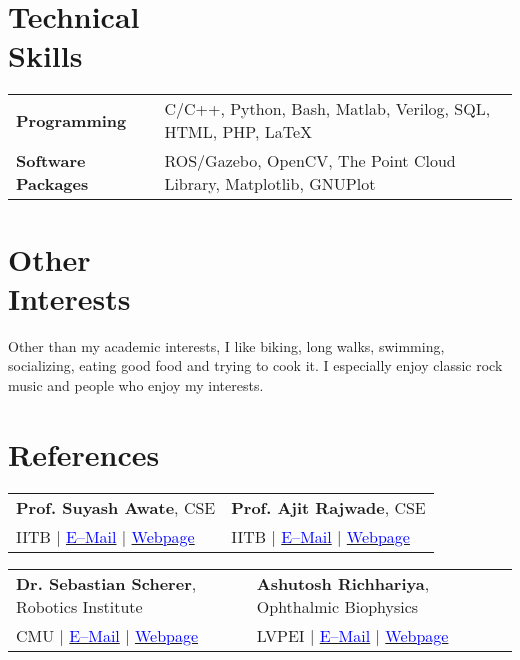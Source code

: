 \documentclass[margin,line]{res}
\begin{document}
\begin{resume}
\section{\sc Technical \\Skills} 
\begin{tabular}{@{}p{1.3in}p{4.3in}}
\textbf{Programming} & C/C++, Python, Bash, Matlab, Verilog, SQL, HTML, PHP, \LaTeX \\  
\vspace*{-0.06in}
\textbf{Software Packages} & 
\vspace*{-0.06in}
ROS/Gazebo, OpenCV, The Point Cloud Library, Matplotlib, GNUPlot \\ 
\end{tabular}
%
\section{\sc Other \\Interests}
Other than my academic interests, I like biking, long walks, swimming, socializing, eating good food and trying to cook it. I especially enjoy classic rock music and people who enjoy my interests.

\section{\sc References}
\begin{tabular}{@{}p{3in}p{3in}}
\textbf{Prof. Suyash Awate}, CSE & \textbf{Prof. Ajit Rajwade}, CSE \\ 
IITB $|$ \href{mailto:suyash@cse.iitb.ac.in}{\textcolor{blue}{E--Mail}} $|$ \href{https://www.cse.iitb.ac.in/~suyash}{\textcolor{blue}{Webpage}} & IITB $|$ \href{mailto:ajitvr@cse.iitb.ac.in}{\textcolor{blue}{E--Mail}} $|$ \href{https://www.cse.iitb.ac.in/~ajitvr}{\textcolor{blue}{Webpage}} \\
\end{tabular}
\vspace{-0.15in}

\begin{tabular}{@{}p{3in}p{3in}}
\textbf{Dr. Sebastian Scherer}, Robotics Institute & \textbf{Ashutosh Richhariya}, Ophthalmic Biophysics \\ 
CMU $|$ \href{mailto:basti@andrew.cmu.edu}{\textcolor{blue}{E--Mail}} $|$ \href{http://www.ri.cmu.edu/person.html?person_id=1397}{\textcolor{blue}{Webpage}} & LVPEI $|$ \href{mailto:ashutosh@lvpei.org}{\textcolor{blue}{E--Mail}} $|$ \href{http://www.lvpei.org/our-team/our-team-ashutosh.php}{\textcolor{blue}{Webpage}} \\
\end{tabular}
\vspace{-0.15in}


\end{resume}
\end{document}
